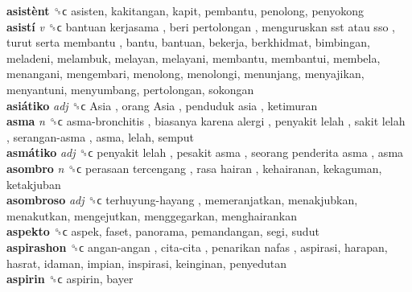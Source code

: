 \textbf{asistènt} ␝ϲ  asisten, kakitangan, kapit, pembantu, penolong, penyokong  \\
\textbf{asistí} \emph{v}  ␝ϲ   bantuan kerjasama ,  beri pertolongan ,  menguruskan sst atau sso ,  turut serta membantu , bantu, bantuan, bekerja, berkhidmat, bimbingan, meladeni, melambuk, melayan, melayani, membantu, membantui, membela, menangani, mengembari, menolong, menolongi, menunjang, menyajikan, menyantuni, menyumbang, pertolongan, sokongan  \\
\textbf{asiátiko} \emph{adj}  ␝ϲ   Asia ,  orang Asia ,  penduduk asia , ketimuran  \\
\textbf{asma} \emph{n}  ␝ϲ   asma-bronchitis ,  biasanya karena alergi ,  penyakit lelah ,  sakit lelah ,  serangan-asma , asma, lelah, semput  \\
\textbf{asmátiko} \emph{adj}  ␝ϲ   penyakit lelah ,  pesakit asma ,  seorang penderita asma , asma  \\
\textbf{asombro} \emph{n}  ␝ϲ   perasaan tercengang ,  rasa hairan , kehairanan, kekaguman, ketakjuban  \\
\textbf{asombroso} \emph{adj}  ␝ϲ   terhuyung-hayang , memeranjatkan, menakjubkan, menakutkan, mengejutkan, menggegarkan, menghairankan  \\
\textbf{aspekto} ␝ϲ  aspek, faset, panorama, pemandangan, segi, sudut  \\
\textbf{aspirashon} ␝ϲ   angan-angan ,  cita-cita ,  penarikan nafas , aspirasi, harapan, hasrat, idaman, impian, inspirasi, keinginan, penyedutan  \\
\textbf{aspirin} ␝ϲ  aspirin, bayer  \\
